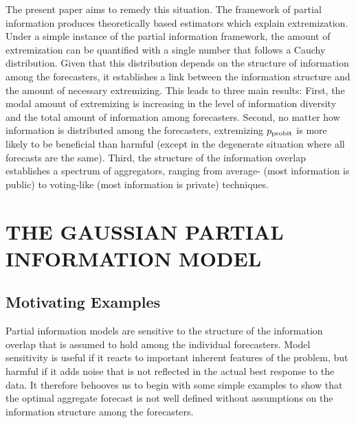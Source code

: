 \documentclass[12pt]{article}
\theoremstyle{definition}
\theoremstyle{definition}
\def\probit{p_{\rm probit}}
\begin{document}
The present paper aims to remedy this situation.  The framework of
partial information produces theoretically based estimators which
explain extremization. Under a simple instance of the partial
information framework, the amount of extremization can be quantified
with a single number that follows a Cauchy distribution.  Given that
this distribution depends on the structure of information among the
forecasters, it establishes a link between the information structure
and the amount of necessary extremizing.  This leads to three main results:  First, the modal
amount of extremizing is increasing in the level of information
diversity and the total amount of information among forecasters.
Second, no matter how information is distributed among the forecasters,
extremizing $\probit$ is more likely to be beneficial
than harmful (except in the degenerate situation where all forecasts
are the same). Third, the structure of the information overlap establishes a spectrum of aggregators, ranging from
average- (most information is public) to voting-like (most information
is private) techniques.

\section{THE GAUSSIAN PARTIAL INFORMATION MODEL}
\label{sec:model}
\subsection{Motivating Examples}
Partial information models are sensitive to the structure of the
information overlap that is assumed to hold among the individual
forecasters. Model sensitivity is useful if it reacts
to important inherent features of the problem, but harmful if it adds
noise that is not reflected in the actual best response to the data.
It therefore behooves us to begin with some simple examples to show
that the optimal aggregate forecast is not well defined without
assumptions on the information structure among the forecasters.
\end{document}
